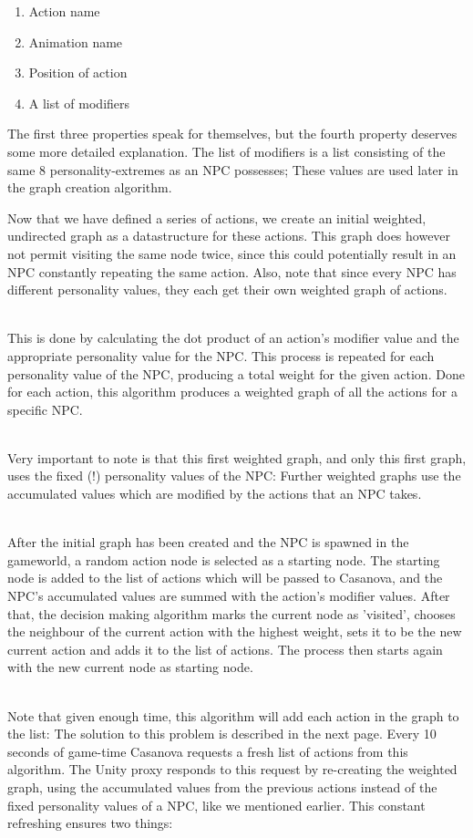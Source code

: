 \documentclass[11pt]{article} %
\begin{document}
\begin{enumerate}
\item Action name
\item Animation name
\item Position of action
\item A list of modifiers
\end{enumerate}

The first three properties speak for themselves, but the fourth property deserves some more detailed explanation. The list of modifiers is a list consisting of the same 8 personality-extremes as an NPC possesses; These values are used later in the graph creation algorithm.

Now that we have defined a series of actions, we create an initial weighted, undirected graph as a datastructure for these actions. This graph does however not permit visiting the same node twice, since this could potentially result in an NPC constantly repeating the same action. Also,  note that since every NPC has different personality values, they each get their own weighted graph of actions. 

~\\
This is done by calculating the dot product of an action's modifier value and the appropriate personality value for the NPC. This process is repeated for each personality value of the NPC, producing a total weight for the given action. Done for each action, this algorithm produces a weighted graph of all the actions for a specific NPC.

~\\
Very important to note is that this first weighted graph, and only this first graph, uses the fixed (!) personality values of the NPC: Further weighted graphs use the accumulated values which are modified by the actions that an NPC takes.

~\\
After the initial graph has been created and the NPC is spawned in the gameworld, a random action node is selected as a starting node. The starting node is added to the list of actions which will be passed to Casanova, and the NPC's accumulated values are summed with the action's modifier values. After that, the decision making algorithm marks the current node as 'visited', chooses the neighbour of the current action with the highest weight, sets it to be the new current action and adds it to the list of actions. The process then starts again with the new current node as starting node. 

~\\
Note that given enough time, this algorithm will add each action in the graph to the list: The solution to this problem is described in the next page.
\newpage
Every 10 seconds of game-time Casanova requests a fresh list of actions from this algorithm. The Unity proxy responds to this request by re-creating the weighted graph, using the accumulated values from the previous actions instead of the fixed personality values of a NPC, like we mentioned earlier. This constant refreshing ensures two things: 
\end{document}
